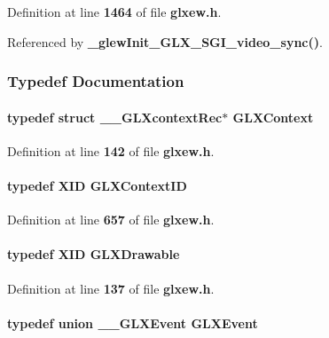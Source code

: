 Definition at line {\bf 1464} of file {\bf glxew.\+h}.



Referenced by {\bf \+\_\+glew\+Init\+\_\+\+G\+L\+X\+\_\+\+S\+G\+I\+\_\+video\+\_\+sync()}.



\subsubsection{Typedef Documentation}
\paragraph[{G\+L\+X\+Context}]{\setlength{\rightskip}{0pt plus 5cm}typedef struct \+\_\+\+\_\+\+G\+L\+Xcontext\+Rec$\ast$ {\bf G\+L\+X\+Context}}\label{glxew_8h_ab14f757b495fc428b0564f1914be5838}


Definition at line {\bf 142} of file {\bf glxew.\+h}.

\paragraph[{G\+L\+X\+Context\+ID}]{\setlength{\rightskip}{0pt plus 5cm}typedef X\+ID {\bf G\+L\+X\+Context\+ID}}\label{glxew_8h_a17c7ca5b76cc448032df0b5352803005}


Definition at line {\bf 657} of file {\bf glxew.\+h}.

\paragraph[{G\+L\+X\+Drawable}]{\setlength{\rightskip}{0pt plus 5cm}typedef X\+ID {\bf G\+L\+X\+Drawable}}\label{glxew_8h_a826f51745d9d6c81bdbac47ae2b80cf7}


Definition at line {\bf 137} of file {\bf glxew.\+h}.

\paragraph[{G\+L\+X\+Event}]{\setlength{\rightskip}{0pt plus 5cm}typedef union {\bf \+\_\+\+\_\+\+G\+L\+X\+Event}  {\bf G\+L\+X\+Event}}\label{glxew_8h_a251904312933c2d12ad95d0633c42d72}
